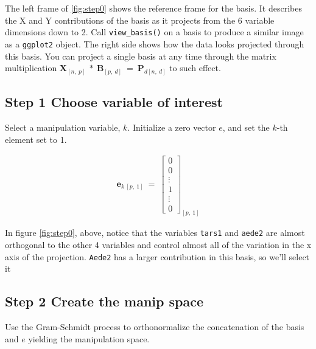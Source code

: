 \documentclass{monashthesis}
\begin{document}
The left frame of \ref{fig:step0} shows the reference frame for the
basis. It describes the X and Y contributions of the basis as it
projects from the 6 variable dimensions down to 2. Call
\texttt{view\_basis()} on a basis to produce a similar image as a
\texttt{ggplot2} object. The right side shows how the data looks
projected through this basis. You can project a single basis at any time
through the matrix multiplication
\(\textbf{X}_{[n,~p]} ~*~ \textbf{B}_{[p,~d]} ~=~ \textbf{P}_{d[n,~d]}\)
to such effect.

\subsection{Step 1 Choose variable of
interest}\label{step-1-choose-variable-of-interest}

Select a manipulation variable, \(k\). Initialize a zero vector \(e\),
and set the \(k\)-th element set to 1.

\begin{align*}
\textbf{e}_{k~[p,~1]} ~=~ 
  \begin{bmatrix}
    0 \\
    0 \\
    \vdots \\
    1 \\
    \vdots \\
    0
  \end{bmatrix}_{[p,~1]}
\end{align*}

In figure \ref{fig:step0}, above, notice that the variables
\texttt{tars1} and \texttt{aede2} are almost orthogonal to the other 4
variables and control almost all of the variation in the x axis of the
projection. \texttt{Aede2} has a larger contribution in this basis, so
we'll select it

\subsection{Step 2 Create the manip
space}\label{step-2-create-the-manip-space}

Use the Gram-Schmidt process to orthonormalize the concatenation of the
basis and \(e\) yielding the manipulation space.
\end{document}
